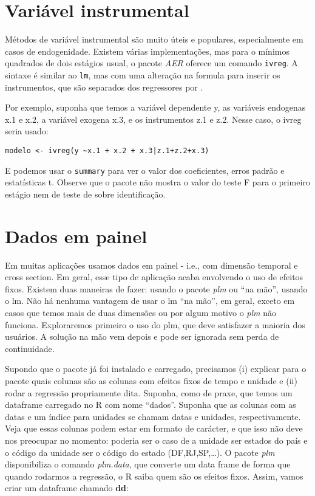 \documentclass[]{book}
\begin{document}
\section{Variável instrumental}\label{variavel-instrumental}

Métodos de variável instrumental são muito úteis e populares,
especialmente em casos de endogenidade. Existem várias implementações,
mas para o mínimos quadrados de dois estágios usual, o pacote \emph{AER}
oferece um comando \texttt{ivreg}. A sintaxe é similar ao \texttt{lm},
mas com uma alteração na formula para inserir os instrumentos, que são
separados dos regressores por \textbar{}.

Por exemplo, suponha que temos a variável dependente y, as variáveis
endogenas x.1 e x.2, a variável exogena x.3, e os instrumentos z.1 e
z.2. Nesse caso, o ivreg seria usado:

\begin{verbatim}
modelo <- ivreg(y ~x.1 + x.2 + x.3|z.1+z.2+x.3)
\end{verbatim}

E podemos usar o \texttt{summary} para ver o valor dos coeficientes,
erros padrão e estatísticas t. Observe que o pacote não mostra o valor
do teste F para o primeiro estágio nem de teste de sobre identificação.

\section{Dados em painel}\label{dados-em-painel}

Em muitas aplicações usamos dados em painel - i.e., com dimensão
temporal e cross section. Em geral, esse tipo de aplicação acaba
envolvendo o uso de efeitos fixos. Existem duas maneiras de fazer:
usando o pacote \emph{plm} ou ``na mão'', usando o lm. Não há nenhuma
vantagem de usar o lm ``na mão'', em geral, exceto em casos que temos
mais de duas dimensões ou por algum motivo o \emph{plm} não funciona.
Exploraremos primeiro o uso do plm, que deve satisfazer a maioria dos
usuários. A solução na mão vem depois e pode ser ignorada sem perda de
continuidade.

Supondo que o pacote já foi instalado e carregado, precisamos (i)
explicar para o pacote quais colunas são as colunas com efeitos fixos de
tempo e unidade e (ii) rodar a regressão propriamente dita. Suponha,
como de praxe, que temos um dataframe carregado no R com nome ``dados''.
Suponha que as colunas com as datas e um índice para unidades se chamam
datas e unidades, respectivamente. Veja que essas colunas podem estar em
formato de carácter, e que isso não deve nos preocupar no momento:
poderia ser o caso de a unidade ser estados do país e o código da
unidade ser o código do estado (DF,RJ,SP,\ldots{}). O pacote \emph{plm}
disponibiliza o comando \emph{plm.data}, que converte um data frame de
forma que quando rodarmos a regressão, o R saiba quem são os efeitos
fixos. Assim, vamos criar um dataframe chamado \textbf{dd}:
\end{document}
